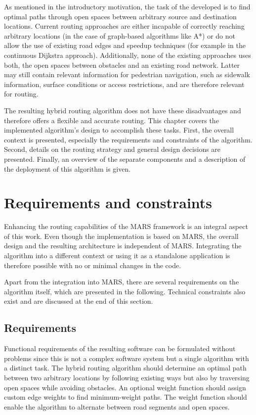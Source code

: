 
As mentioned in the introductory motivation, the task of the developed  is to find optimal paths through open spaces between arbitrary source and destination locations.
Current routing approaches are either incapable of correctly reaching arbitrary locations (in the case of graph-based algorithms like A*) or do not allow the use of existing road edges and speedup techniques (for example in the continuous Dijkstra approach).
Additionally, none of the existing approaches uses both, the open spaces between obstacles and an existing road network.
Latter may still contain relevant information for pedestrian navigation, such as sidewalk information, surface conditions or access restrictions, and are therefore relevant for routing.

The resulting hybrid routing algorithm does not have these disadvantages and therefore offers a flexible and accurate routing.
This chapter covers the implemented algorithm's design to accomplish these tasks.
First, the overall context is presented, especially the requirements and constraints of the algorithm.
Second, details on the routing strategy and general design decisions are presented.
Finally, an overview of the separate components and a description of the deployment of this algorithm is given.

\section{Requirements and constraints}
	
	Enhancing the routing capabilities of the MARS framework is an integral aspect of this work.
	Even though the implementation is based on MARS, the overall design and the resulting architecture is independent of MARS.
	Integrating the algorithm into a different context or using it as a standalone application is therefore possible with no or minimal changes in the code.
	
	Apart from the integration into MARS, there are several requirements on the algorithm itself, which are presented in the following.
	Technical constraints also exist and are discussed at the end of this section.
	
	\subsection{Requirements}
	
		Functional requirements of the resulting software can be formulated without problems since this is not a complex software system but a single algorithm with a distinct task.
		The hybrid routing algorithm should determine an optimal path between two arbitrary locations by following existing ways but also by traversing open spaces while avoiding obstacles.
		An optional weight function should assign custom edge weights to find minimum-weight paths.
		The weight function should enable the algorithm to alternate between road segments and open spaces.
		
